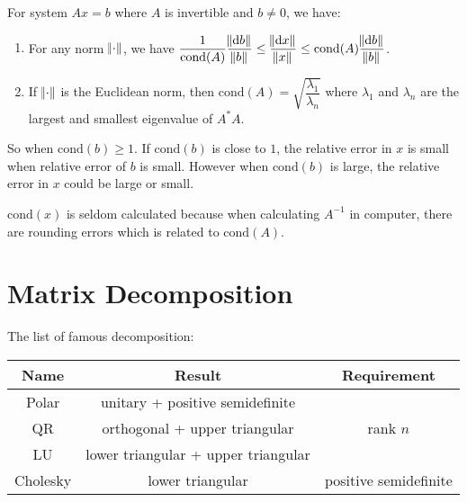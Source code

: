 \begin{theorem}
    For system $Ax=b$ where $A$ is invertible and $b \neq 0$, we have:
    \begin{enumerate}
        \item For any norm $\norm{\cdot}$, we have $\dfrac{1}{\text{cond}(A)} \dfrac{\norm{\dif b}}{\norm{b}} \leq \dfrac{\norm{\dif x}}{\norm{x}} \leq \text{cond}(A) \dfrac{\norm{\dif b}}{\norm{b}}$.
        \item If $\norm{\cdot}$ is the Euclidean norm, then $\text{cond}(A) = \sqrt{\dfrac{\lambda_1}{\lambda_n}}$ where $\lambda_1$ and $\lambda_n$ are the largest and smallest eigenvalue of $A^*A$.
    \end{enumerate}
    
    So when $\text{cond} (b) \geq 1$. If $\text{cond}(b)$ is close to $1$, the relative error in $x$ is small when relative error of $b$ is small. However when $\text{cond}(b)$ is large, the relative error in $x$ could be large or small. 
    
    $\text{cond}(x)$ is seldom calculated because when calculating $A^{-1}$ in computer, there are rounding errors which is related to $\text{cond}(A)$.
\end{theorem}



%
%
%
%

\section{Matrix Decomposition}

The list of famous decomposition:

\begin{table}[H]
\centering
\begin{tabular}[t]{ccc}
\hline
Name & Result & Requirement \\ \hline
Polar & unitary + positive semidefinite & \\
QR & orthogonal + upper triangular & rank $n$ \\
LU & lower triangular + upper triangular & \\
Cholesky & lower triangular & positive semidefinite \\ \hline
\end{tabular}
\end{table}

